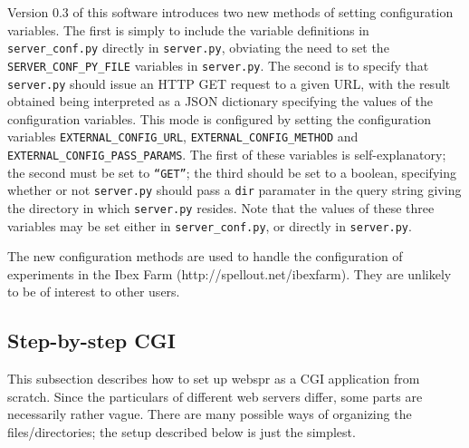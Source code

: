 \documentclass[11pt,letterpaper]{article}
\begin{document}
Version 0.3 of this software introduces two new methods of setting
configuration variables. The first is simply to include the variable
definitions in \texttt{server\_conf.py} directly in \texttt{server.py}, obviating the need
to set the \texttt{SERVER\_CONF\_PY\_FILE} variables in \texttt{server.py}. The second
is to specify that \texttt{server.py} should issue an HTTP GET request to a given
URL, with the result obtained being interpreted as a JSON dictionary specifying the
values of the configuration variables. This mode is configured by setting
the configuration variables \texttt{EXTERNAL\_CONFIG\_URL}, \texttt{EXTERNAL\_CONFIG\_METHOD}
and \texttt{EXTERNAL\_CONFIG\_PASS\_PARAMS}. The first of these variables is self-explanatory;
the second must be set to \texttt{``GET''}; the third should be set to a boolean,
specifying whether or not \texttt{server.py} should pass a \texttt{dir} paramater in the
query string giving the directory in which \texttt{server.py} resides.
Note that the values of these three variables may be set either in \texttt{server\_conf.py},
or directly in \texttt{server.py}.

The new configuration methods are used to handle the configuration
of experiments in the Ibex Farm (http://spellout.net/ibexfarm).
They are unlikely to be of interest to other users.

\subsection{Step-by-step CGI}

This subsection describes how to set up webspr as a CGI application from
scratch.  Since the particulars of different web servers differ, some parts are
necessarily rather vague. There are many possible ways of organizing the
files/directories; the setup described below is just the simplest.
\end{document}
